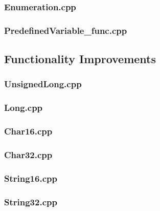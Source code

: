 \documentclass[11pt,]{report}
\begin{document}
\begin{appendix}
\subsubsection{Enumeration.cpp}
\label{sub:Enumeration}


\subsubsection{PredefinedVariable\_func.cpp}
\label{sub:PredefinedVariable_func}


\subsection{Functionality Improvements}
\label{subsection:Functionality}

\subsubsection{UnsignedLong.cpp}
\label{sub:UnsignedLong.cpp}


\subsubsection{Long.cpp}
\label{sub:LongLong}


\subsubsection{Char16.cpp}
\label{sub:Char16}


\subsubsection{Char32.cpp}
\label{sub:Char32}


\subsubsection{String16.cpp}
\label{sub:String16}


\subsubsection{String32.cpp}
\label{sub:String32}



\end{appendix}
\end{document}

